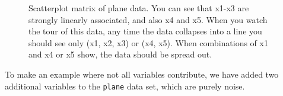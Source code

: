 \documentclass[
  letterpaper,
]{krantz}
\begin{document}
\begin{figure}[H]


\caption{\label{fig-plane-scatmat}Scatterplot matrix of plane data. You
can see that x1-x3 are strongly linearly associated, and also x4 and x5.
When you watch the tour of this data, any time the data collapses into a
line you should see only (x1, x2, x3) or (x4, x5). When combinations of
x1 and x4 or x5 show, the data should be spread out.}

\end{figure}%

To make an example where not all variables contribute, we have added two
additional variables to the \texttt{plane} data set, which are purely
noise.
\end{document}
